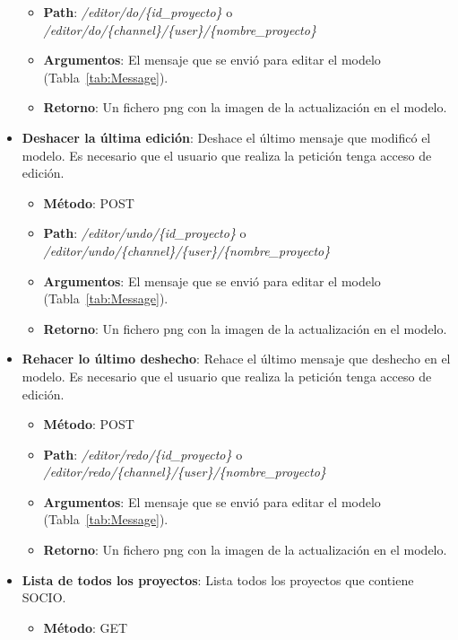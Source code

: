 \begin{itemize}
\begin{itemize}
	\item \textbf{Path}: \textit{/editor/do/\{id\_proyecto\}} o\\ \textit{/editor/do/\{channel\}/\{user\}/\{nombre\_proyecto\}}
	\item \textbf{Argumentos}: El mensaje que se envió para editar el modelo (Tabla~\ref{tab:Message}).\\
	\item \textbf{Retorno}: Un fichero png con la imagen de la actualización en el modelo.	
	\end{itemize}
\item \textbf{Deshacer la última edición}: Deshace el último mensaje que modificó el modelo. Es necesario que el usuario que realiza la petición tenga acceso de edición.
	\begin{itemize}
	\item \textbf{Método}: POST
	\item \textbf{Path}: \textit{/editor/undo/\{id\_proyecto\}} o\\ \textit{/editor/undo/\{channel\}/\{user\}/\{nombre\_proyecto\}}
	\item \textbf{Argumentos}: El mensaje que se envió para editar el modelo (Tabla~\ref{tab:Message}).\\
	\item \textbf{Retorno}: Un fichero png con la imagen de la actualización en el modelo.	
	\end{itemize}
\item \textbf{Rehacer lo último deshecho}: Rehace el último mensaje que deshecho en el modelo. Es necesario que el usuario que realiza la petición tenga acceso de edición.
	\begin{itemize}
	\item \textbf{Método}: POST
	\item \textbf{Path}: \textit{/editor/redo/\{id\_proyecto\}} o\\ \textit{/editor/redo/\{channel\}/\{user\}/\{nombre\_proyecto\}}
	\item \textbf{Argumentos}: El mensaje que se envió para editar el modelo (Tabla~\ref{tab:Message}).\\
	\item \textbf{Retorno}: Un fichero png con la imagen de la actualización en el modelo.	
	\end{itemize}
\item \textbf{Lista de todos los proyectos}: Lista todos los proyectos que contiene SOCIO.
	\begin{itemize}
	\item \textbf{Método}: GET

\end{itemize}
\end{itemize}
